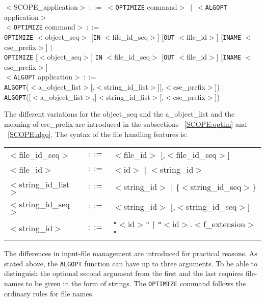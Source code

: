 $<$SCOPE\_application$>~::=$ $<${\tt OPTIMIZE} command$>~\mid~<${\tt ALGOPT} application$>$\\
$<${\tt OPTIMIZE} command$>~::=$\\
\hspace*{1cm}  {\tt OPTIMIZE} $<$object\_seq$>$ [{\tt IN} $<$file\_id\_seq$>$] [{\tt OUT} $<$file\_id$>$] [{\tt INAME} $<$cse\_prefix$>$] $\mid$\\
\hspace*{1cm}  {\tt OPTIMIZE} [$<$object\_seq$>$] {\tt IN} $<$file\_id\_seq$>$ [{\tt OUT} $<$file\_id$>$] [{\tt INAME} $<$cse\_prefix$>$]\\
$<${\tt ALGOPT} application$>~::=$\\
\hspace*{1cm}  {\tt ALGOPT}($<$a\_object\_list$>$[,$<$string\_id\_list$>$][,$<$cse\_prefix$>$]) $\mid$\\
\hspace*{1cm}  {\tt ALGOPT}([$<$a\_object\_list$>$,]$<$string\_id\_list$>$[,$<$cse\_prefix$>$])

The different variations for the object\_seq and
the a\_object\_list and the meaning of cse\_prefix are introduced
in the subsections ~\ref{SCOPE:optim} and ~\ref{SCOPE:algo}. 
The syntax of the file handling features is: 
\begin{center}
\begin{tabular}{lcl}
$<$file\_id\_seq$>$ & $::=$ & $<$file\_id$>$ [,$<$file\_id\_seq$>$]\\
$<$file\_id$>$ & $::=$ & $<$id$>$ $\mid$ $<$string\_id$>$\\
$<$string\_id\_list$>$ & $::=$ & $<$string\_id$>$ $\mid$ 
 \{$<$string\_id\_seq$>$\}\\
$<$string\_id\_seq$>$ & $::=$ & $<$string\_id$>$ [,$<$string\_id\_seq$>$]\\
$<$string\_id$>$ & $::=$ & {\tt "}$<$id$>${\tt "} $\mid$ 
{\tt "}$<$id$>.<$f\_extension$>${\tt "}
\end{tabular}
\end{center}

The differences in input-file management are introduced for practical reasons.
As stated above, the {\tt ALGOPT} function can have up to three arguments.
To be able to distinguish the optional second argument from the first and the
last requires file-names to be  given in the form of strings. The
{\tt OPTIMIZE} command follows the ordinary {\REDUCE} rules for file names.

